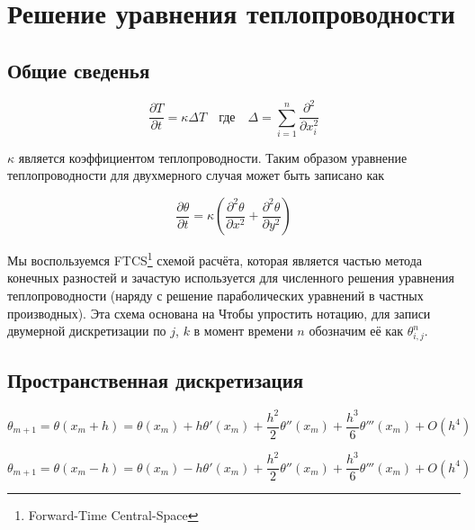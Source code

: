 \documentclass[a4paper]{extarticle}
\begin{document}
\newpage

\section{Решение уравнения теплопроводности}

\subsection{Общие сведенья}

\begin{equation}
\frac{\partial{T}}{\partial{t}} = \kappa\Delta T \quad  \text{где} \quad \Delta = \sum_{i=1}^n\frac{\partial^2}{\partial{x_i^2}}
\end{equation}

$\kappa$ является коэффициентом теплопроводности. Таким образом уравнение теплопроводности для двухмерного случая может быть записано как

\begin{equation}
\label{eqn:expanded}
\frac{\partial\theta}{\partial{t}} = \kappa\left(\frac{\partial^2\theta}{\partial{x^2}}+\frac{\partial^2\theta}{\partial{y^2}}\right)
\end{equation}

Мы воспользуемся FTCS\footnote{Forward-Time Central-Space}\cite{ftcs} схемой расчёта, которая является частью метода конечных разностей и зачастую используется для численного решения уравнения теплопроводности (наряду с решение параболических уравнений в частных производных). Эта схема основана на Чтобы упростить нотацию, для записи двумерной дискретизации по $j$, $k$ в момент времени $n$ обозначим её как $\theta^n_{i,j}$.

\subsection{Пространственная дискретизация}

\begin{equation}
\label{eqn:series1}
\theta_{m+1} = \theta(x_m + h) = \theta(x_m)  +h\theta'(x_m) + \frac{h^2}{2}\theta''(x_m) + \frac{h^3}{6}\theta'''(x_m) + O(h^4)
\end{equation}

\begin{equation}
\label{eqn:series2}
	\theta_{m+1} = \theta(x_m -h) = \theta(x_m) - h\theta'(x_m) + \frac{h^2}{2}\theta''(x_m) + \frac{h^3}{6}\theta'''(x_m) + O(h^4)
\end{equation}
\end{document}
